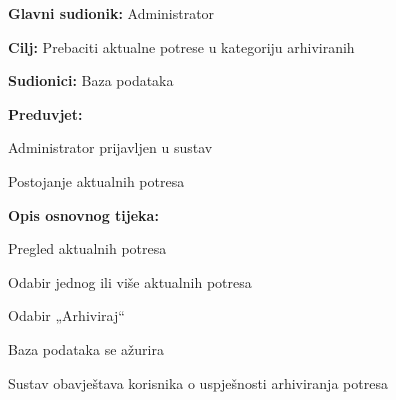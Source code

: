 					\noindent {}
					\begin{packed_item}
	
						\item \textbf{Glavni sudionik:} Administrator
						\item \textbf{Cilj:} Prebaciti aktualne potrese u kategoriju arhiviranih
						\item \textbf{Sudionici:} Baza podataka
						\item \textbf{Preduvjet:} 
						\begin{packed_item}
							\item Administrator prijavljen u sustav
							\item Postojanje aktualnih potresa
						\end{packed_item}

						\item \textbf{Opis osnovnog tijeka:}
						
						\item[] \begin{packed_enum}
	
							\item Pregled aktualnih potresa
							\item Odabir jednog ili više aktualnih potresa
							\item Odabir „Arhiviraj“
							\item Baza podataka se ažurira
							\item Sustav obavještava korisnika o uspješnosti arhiviranja potresa
							
						\end{packed_enum}
					\end{packed_item}

